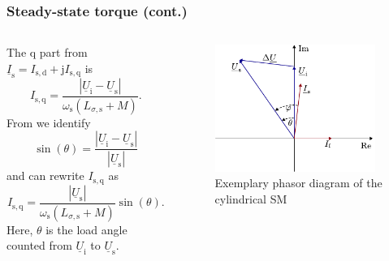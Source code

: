 \begin{frame}
	\frametitle{Steady-state torque (cont.)}
    \begin{columns}
		\begin{column}{0.55\textwidth}
			The q part from $\underline{I}_\mathrm{s}=I_\mathrm{s,d} + \mathrm{j}I_\mathrm{s,q}$ is
			\begin{equation}
				I_\mathrm{s,q} = \frac{\left|\underline{U}_\mathrm{i} - \underline{U}_\mathrm{s}\right|}{\omega_\mathrm{s} \left(L_{\sigma,\mathrm{s}} + M\right)}.
			\end{equation}
		From  we identify 
		$$\sin(\theta) = \frac{\left|\underline{U}_\mathrm{i} - \underline{U}_\mathrm{s}\right|}{\left|\underline{U}_\mathrm{s}\right|}$$
		and can rewrite $I_\mathrm{s,q}$ as
		\begin{equation}
			I_\mathrm{s,q} = \frac{\left|\underline{U}_\mathrm{s}\right|}{\omega_\mathrm{s} \left(L_{\sigma,\mathrm{s}} + M\right)} \sin(\theta).
		\end{equation}
		Here, $\theta$ is the load angle counted from $\underline{U}_\mathrm{i}$ to $\underline{U}_\mathrm{s}$.
        \end{column}
        \begin{column}{0.45\textwidth}
            \begin{figure}
                \centering
                \includegraphics[width=0.95\textwidth]{fig/lec07/Load_angle_voltage_phasors.pdf}
                \caption{Exemplary phasor diagram of the cylindrical SM}
                \label{fig:Load_angle_voltage_phasors}
            \end{figure}
        \end{column}
    \end{columns}
\end{frame}

